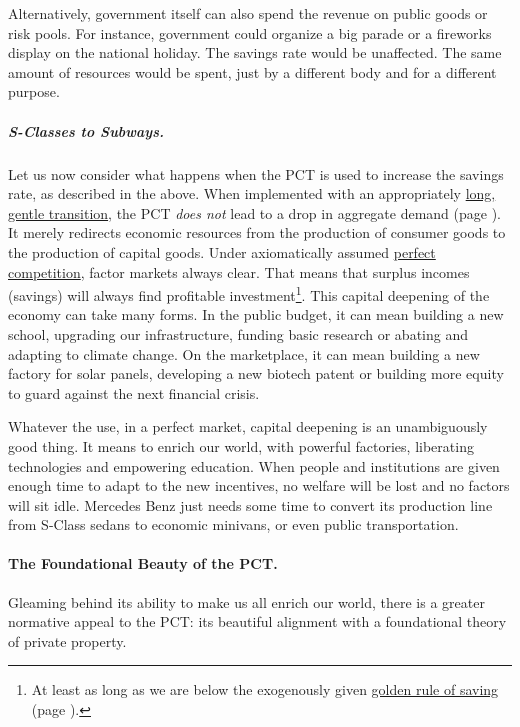 Alternatively, government itself can also spend the revenue on public goods or risk pools. For instance, government could organize a big parade or a fireworks display on the national holiday. The savings rate would be unaffected. The same amount of resources would be spent, just by a different body and for a different purpose.

\subparagraph{S-Classes to Subways.} Let us now consider what happens when the PCT is used to increase the savings rate, as described in the above. When implemented with an appropriately \hyperref[sec:GoSlow]{long, gentle transition}, the PCT \emph{does not} lead to a drop in aggregate demand (page \pageref{sec:GoSlow}). It merely redirects economic resources from the production of consumer goods to the production of capital goods. Under axiomatically assumed \hyperref[sec:PerfectCompetition]{perfect competition}, factor markets always clear. That means that surplus incomes (savings) will always find profitable investment\footnote{
	At least as long as we are below the exogenously given \hyperref[eq:GoldenRuleSavings]{golden rule of saving} (page \pageref{eq:GoldenRuleSavings}).}.
This capital deepening of the economy can take many forms. In the public budget, it can mean building a new school, upgrading our infrastructure, funding basic research or abating and adapting to climate change. On the marketplace, it can mean building a new factory for solar panels, developing a new biotech patent or building more equity to guard against the next financial crisis.

Whatever the use, in a perfect market, capital deepening is an unambiguously good thing. It means to enrich our world, with powerful
factories, liberating technologies and empowering education. When people and institutions are given enough time to adapt to the new incentives, no welfare will be lost and no factors will sit idle. Mercedes Benz just needs some time to convert its production line from S-Class sedans to economic minivans, or even public transportation.


\paragraph{The Foundational Beauty of the PCT.}  \label{sec:FoundationalBeauty} Gleaming behind its ability to make us all enrich our world, there is a greater normative appeal to the PCT: its beautiful alignment with a foundational theory of private property.

